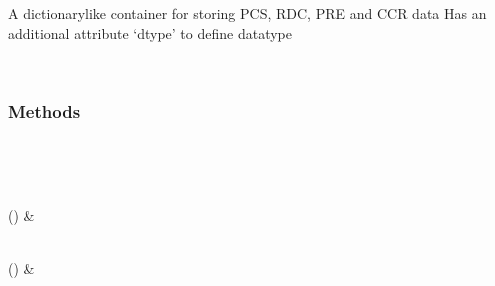 \documentclass[a4paper,10pt,english,openany,oneside]{sphinxmanual}
\begin{document}
\begin{fulllineitems}
\label{\detokenize{reference/generated/paramagpy.dataparse.DataContainer:paramagpy.dataparse.DataContainer}}
\sphinxAtStartPar
A dictionary\sphinxhyphen{}like container for storing
PCS, RDC, PRE and CCR data
Has an additional attribute ‘dtype’ to define datatype

\begin{fulllineitems}
\label{\detokenize{reference/generated/paramagpy.dataparse.DataContainer:paramagpy.dataparse.DataContainer.__init__}}~\subsubsection*{Methods}


\begin{savenotes}\sphinxatlongtablestart\begin{longtable}[c]{}
\hline

\endfirsthead

%
{}\\
\hline

\endhead

\hline
{}\\
\endfoot

\endlastfoot

\sphinxAtStartPar
{\hyperref[\detokenize{reference/generated/paramagpy.dataparse.DataContainer.clear:paramagpy.dataparse.DataContainer.clear}]{}}()
&
\sphinxAtStartPar

\\
\hline
\sphinxAtStartPar
{\hyperref[\detokenize{reference/generated/paramagpy.dataparse.DataContainer.copy:paramagpy.dataparse.DataContainer.copy}]{}}()
&
\sphinxAtStartPar


\end{longtable}
\end{savenotes}
\end{fulllineitems}
\end{fulllineitems}
\end{document}
